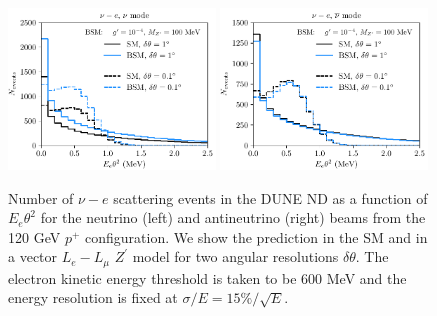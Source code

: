 \begin{figure}[t]
%
\centering
%
\includegraphics[width=0.49\textwidth]{Etheta2_nu_new.pdf}
\includegraphics[width=0.49\textwidth]{Etheta2_nubar_new.pdf}
%
\caption[Neutrino-electron scattering distributions in the presence of a $Z^\prime$.]{Number of $\nu-e$ scattering events in the DUNE ND as a function of $E_e\theta^2$ for the neutrino (left) and antineutrino (right) beams from the 120 GeV $p^+$ configuration. We show the prediction in the SM and in a vector $L_e-L_\mu$ $Z^\prime$ model for two angular resolutions $\delta\theta$. The electron kinetic energy threshold is taken to be $600$ MeV and the energy resolution is fixed at $\sigma/E = 15\%/\sqrt{E}$. \label{fig:nuedist}}
%
\end{figure}


